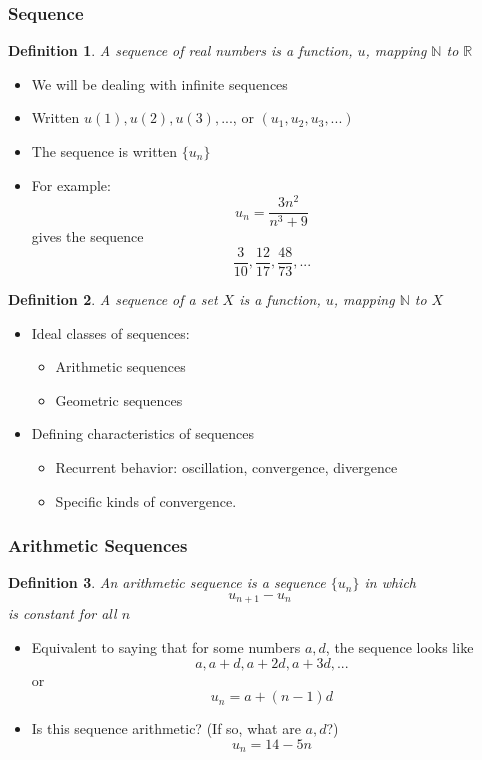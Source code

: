 \documentclass{beamer}
\newtheorem{defn}{Definition}
\numberwithin{equation}{section}
\begin{document}
\begin{frame}
\frametitle{Sequence}

\begin{defn}
A \alert{sequence} of real numbers is a function, $u$, mapping $\mathbb{N}$ to $\mathbb{R}$
\end{defn} \pause

\begin{itemize}
\item We will be dealing with infinite sequences \pause
\item Written $u(1), u(2), u(3), ... $, or $(u_1, u_2, u_3, ...)$ \pause
\item The sequence is written $\{u_n\}$ \pause
\item For example: $$u_{n} = \frac{3n^2}{n^3+9}$$ gives the sequence $$\frac{3}{10}, \frac{12}{17}, \frac{48}{73}, ...$$
\end{itemize}
\begin{defn}
A \alert{sequence} of a set $X$ is a function, $u$, mapping $\mathbb{N}$ to $X$
\end{defn} 
\end{frame}


\begin{frame}
\begin{itemize}
\item Ideal classes of sequences:
\begin{itemize}
\item Arithmetic sequences
\item Geometric sequences
\end{itemize}
\item Defining characteristics of sequences
\begin{itemize}
\item Recurrent behavior: oscillation, convergence, divergence
\item Specific kinds of convergence.
\end{itemize}
\end{itemize}

\end{frame}




\begin{frame}
\frametitle{Arithmetic Sequences}

\begin{defn}
An arithmetic sequence is a sequence $\{u_n\}$ in which $$u_{n+1} - u_{n}$$ is constant for all $n$
\end{defn} \pause

\begin{itemize}
\item Equivalent to saying that for some numbers $a, d$, the sequence looks like $$a, a+d, a+2d, a+3d, ...$$ or $$u_n=a+(n-1)d$$ \pause
\item Is this sequence arithmetic? (If so, what are $a, d$?) $$u_{n} = 14 - 5n$$
\end{itemize}

\end{frame}
\end{document}
